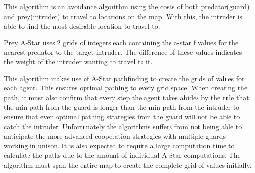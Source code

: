 This algorithm is an avoidance algorithm using the costs of both predator(guard) and prey(intruder) to travel to locations on the map. With this, the intruder is able to find the most desirable location to travel to.

    Prey A-Star uses 2 grids of integers each containing the a-star f values for the nearest predator to the target intruder. The difference of these values indicates the weight of the intruder wanting to travel to it.
    
    
    This algorithm makes use of A-Star pathfinding to create the grids of values for each agent. This ensures optimal pathing to every grid space. When creating the path, it must also confirm that every step the agent takes abides by the rule that the min path from the guard is longer than the min path from the intruder to ensure that even optimal pathing strategies from the guard will not be able to catch the intruder. 
    Unfortunately the algorithms suffers from not being able to anticipate the more advanced cooperation strategies with multiple guards working in unison. It is also expected to require a large computation time to calculate the paths due to the amount of individual A-Star computations. The algorithm must span the entire map to create the complete grid of values initially. 

